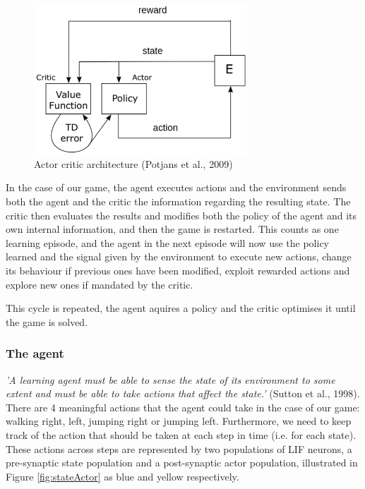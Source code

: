 \documentclass[10pt]{article}
\begin{document}
    \begin{figure}[ht!]
    \centering
    \includegraphics[width=80mm]{./actorCriticDiagram.png}
    \caption{Actor critic architecture (Potjans et al., 2009)}
    \label{fig:potjansArchitecture}
    \end{figure}

    In the case of our game, the agent executes actions and the environment sends both the agent and the critic the information regarding the resulting state. The critic then evaluates the results and modifies both the policy of the agent and its own internal information, and then the game is restarted. This counts as one learning episode, and the agent in the next episode will now use the policy learned and the signal given by the environment to execute new actions, change its behaviour if previous ones have been modified, exploit rewarded actions and explore new ones if mandated by the critic. 
    
    This cycle is repeated, the agent aquires a policy and the critic optimises it until the game is solved.

    \subsubsection{The agent}

    \textit{'A learning agent must be able to sense the state of its environment to some extent and must be able to take actions that affect the state.'} (Sutton et al., 1998). There are 4 meaningful actions that the agent could take in the case of our game: walking right, left, jumping right or jumping left. Furthermore, we need to keep track of the action that should be taken at each step in time (i.e. for each state). These actions across steps are represented by two populations of LIF neurons, a pre-synaptic state population and a post-synaptic actor population, illustrated in Figure \ref{fig:stateActor} as blue and yellow respectively.
    
\end{document}
